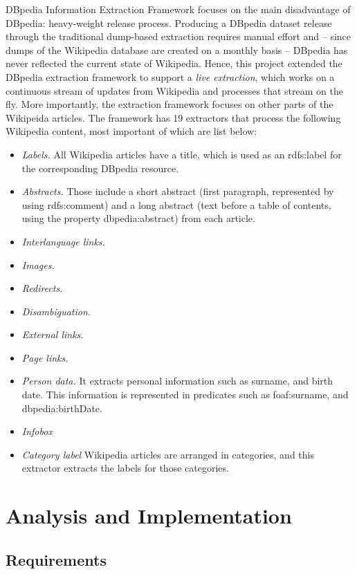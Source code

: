 \documentclass[thesis=M,english,hidelinks]{FITthesis}[2019/12/23]
\begin{document}
DBpedia Information Extraction Framework focuses on the main disadvantage of DBpedia: heavy-weight release process. Producing a DBpedia dataset release through the traditional dump-based extraction requires manual effort and – since dumps of the Wikipedia database are created on a monthly basis – DBpedia has never reflected the current state of Wikipedia. Hence, this project extended the DBpedia extraction framework to support a \textit{live extraction}, which works on a continuous stream of updates from Wikipedia and processes that stream on the fly. More importantly, the extraction framework focuses on other parts of the Wikipeida articles. The framework has 19 extractors that process the following Wikipedia content, most important of which are list below:
\begin{itemize}
	\item \textit{Labels.} All Wikipedia articles have a title, which is used as an rdfs:label for the
	corresponding DBpedia resource.
	\item \textit{Abstracts.} Those include a short abstract (first paragraph, represented by using rdfs:comment) and a long abstract (text before a table of contents, using the 	property dbpedia:abstract) from each article.
	\item \textit{Interlanguage links. }
	\item \textit{Images.}
	\item \textit{Redirects.}
	\item \textit{Disambiguation.}
	\item \textit{External links.}
	\item \textit{Page links.}
	\item \textit{Person data.} It extracts personal information such as surname, and birth date.	This information is represented in predicates such as foaf:surname, and dbpedia:birthDate.
	\item \textit{Infobox}
	\item \textit{Category label} Wikipedia articles are arranged in categories, and this extractor	extracts the labels for those categories.
\end{itemize}


\chapter{Analysis and Implementation}

\section{Requirements}\label{framework_requirements}
\end{document}
